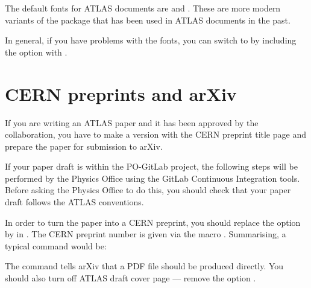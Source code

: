 The default fonts for ATLAS documents are  and .
These are more modern variants of the package  that has been used in
ATLAS documents in the past.

In general, if you have problems with the  fonts,
you can switch to  by including the option  with .


\section{CERN preprints and arXiv}
\label{sec:preprint}

If you are writing an ATLAS paper and it has been approved by the collaboration,
you have to make a version with the CERN preprint title page and prepare the 
paper for submission to arXiv.

If your paper draft is within the PO-GitLab project, the following steps will be
performed by the Physics Office using the GitLab Continuous Integration tools.
Before asking the Physics Office to do this,
you should check that your paper draft follows the ATLAS conventions.

In order to turn the paper into a CERN preprint,
you should replace the option  by  in .
The CERN preprint number is given via the macro .
Summarising, a typical  command would be:
The  command tells arXiv that a PDF file should be produced directly.
You should also turn off ATLAS draft cover page --- remove the option .

